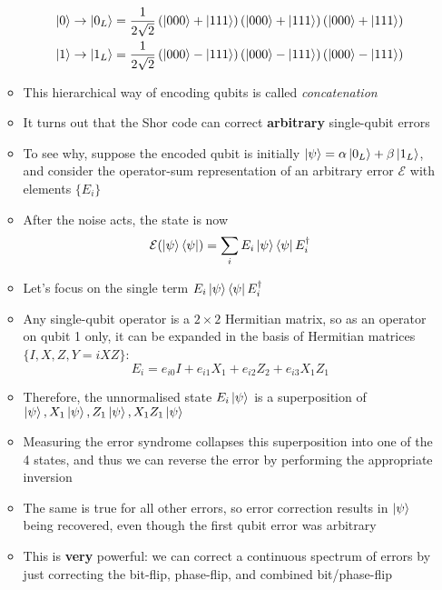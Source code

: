 \documentclass[12pt,a4paper]{article}
\numberwithin{equation}{section}
\newcommand{\ketbra}[2]{\ket{#1}\bra{#2}}
\newcommand{\ketbras}[1]{\ketbra{#1}{#1}}
\begin{document}
\begin{itemize}
\begin{itemize}
\begin{equation}
				\begin{aligned}
					\ket{0}&\to\ket{0_{L}}=\frac{1}{2\sqrt{2}}\left(\ket{000}+\ket{111}\right)\left(\ket{000}+\ket{111}\right)\left(\ket{000}+\ket{111}\right)\\
					\ket{1}&\to\ket{1_{L}}=\frac{1}{2\sqrt{2}}\left(\ket{000}-\ket{111}\right)\left(\ket{000}-\ket{111}\right)\left(\ket{000}-\ket{111}\right)
				\end{aligned}
			\end{equation}
			\item This hierarchical way of encoding qubits is called \textit{concatenation} 
			\item It turns out that the Shor code can correct \textbf{arbitrary} single-qubit errors
			\item To see why, suppose the encoded qubit is initially $\ket{\psi}=\alpha\ket{0_{L}}+\beta\ket{1_L}$, and consider the operator-sum representation of an arbitrary error $\mathcal{E}$ with elements $\{E_{i}\}$
			\item After the noise acts, the state is now
			$$
				\mathcal{E}(\ketbras{\psi})=\sum_{i}E_{i}\ketbras{\psi}E_{i}^{\dagger}
			$$
			\item Let's focus on the single term $E_{i}\ketbras{\psi}E_{i}^{\dagger}$
			\item Any single-qubit operator is a $2\times 2$ Hermitian matrix, so as an operator on qubit 1 only, it can be expanded in the basis of Hermitian matrices $\{I,X,Z,Y=iXZ\}$:
			\begin{equation}
				E_{i}=e_{i0}I+e_{i1}X_{1}+e_{i2}Z_{2}+e_{i3}X_{1}Z_{1}
			\end{equation}
			\item Therefore, the unnormalised state $E_{i}\ket{\psi}$ is a superposition of $\ket{\psi},X_{1}\ket{\psi}, Z_{1}\ket{\psi},X_{1}Z_{1}\ket{\psi}$
			\item Measuring the error syndrome collapses this superposition into one of the 4 states, and thus we can reverse the error by performing the appropriate inversion
			\item The same is true for all other errors, so error correction results in $\ket{\psi}$ being recovered, even though the first qubit error was arbitrary
			\item This is \textbf{very} powerful: we can correct a continuous spectrum of errors by just correcting the bit-flip, phase-flip, and combined bit/phase-flip
		\end{itemize}
	\end{itemize}
\end{document}
